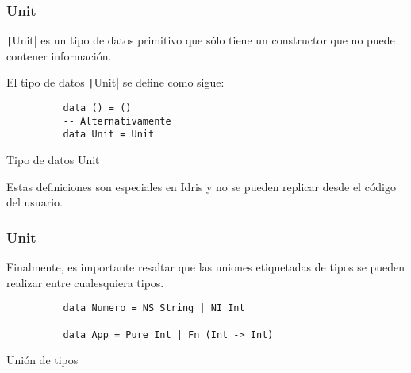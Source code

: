 \documentclass{beamer}
\begin{document}
\begin{frame}[fragile]
  \frametitle{Unit}

  \texttt|Unit| es un tipo de datos primitivo que sólo tiene un constructor
  que no puede contener información.

  El tipo de datos \texttt|Unit| se define como sigue:

  \begin{listing}[H]
    \begin{center}
      \begin{minipage}{0.42\textwidth}
          \begin{verbatim}
          data () = ()
          -- Alternativamente
          data Unit = Unit
          \end{verbatim}
      \end{minipage}
    \end{center}
    \caption{Tipo de datos Unit}
    \label{lst:unitdatatype}
  \end{listing}

  Estas definiciones son especiales en Idris y no se pueden replicar desde el código
  del usuario.

\end{frame}

\begin{frame}[fragile]
  \frametitle{Unit}

  Finalmente, es importante resaltar que las uniones etiquetadas de tipos se pueden
  realizar entre cualesquiera tipos.

  \begin{listing}[H]
    \begin{center}
      \begin{minipage}{0.6\textwidth}
          \begin{verbatim}
          data Numero = NS String | NI Int

          data App = Pure Int | Fn (Int -> Int)
          \end{verbatim}
      \end{minipage}
    \end{center}
    \caption{Unión de tipos}
    \label{lst:masunionesdetipos}
  \end{listing}
\end{frame}
\end{document}
